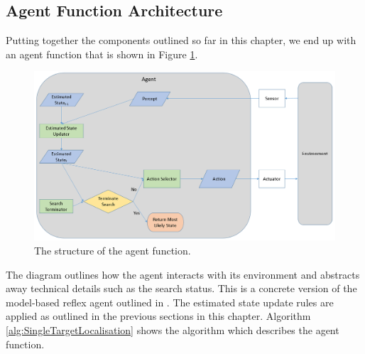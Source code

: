 \subsection{Agent Function Architecture}\label{subsec:AgentFNArch}
Putting together the components outlined so far in this chapter, we end up with an agent function that is shown in Figure \ref{fig:BasicAgentArchitecture}. 

\begin{figure}[H]
    \centering
    \includegraphics[width = 0.8\linewidth]{Chapters/MultiAgentTargetDetection/Figs/AgentFnArchitecture/BasicAgentFunctionNoCommunication.PNG}
    \caption{The structure of the agent function.}
    \label{fig:BasicAgentArchitecture}
\end{figure}


The diagram outlines how the agent interacts with its environment and abstracts away technical details such as the search status. This is a concrete version of the model-based reflex agent outlined in \cite[P~.51]{AIAMA}. The estimated state update rules are applied as outlined in the previous sections in this chapter. Algorithm \ref{alg:SingleTargetLocalisation} shows the algorithm which describes the agent function.



